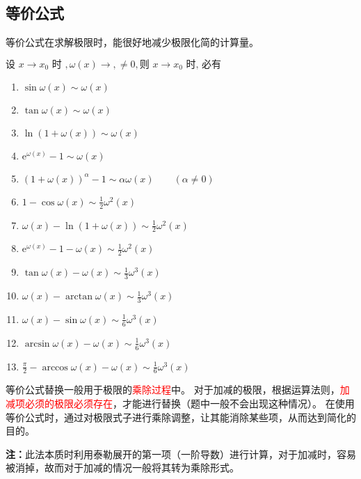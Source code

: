 \subsection{等价公式}
等价公式在求解极限时，能很好地减少极限化简的计算量。
\begin{theorem}
    \label{th:等价公式}
    $\text{设~}x\to x_0\text{ 时~},\omega(x)\to,\neq 0, \text{则~}x\to x_0\text{ 时, 必有}$
    \begin{multicols}{2}
        \begin{enumerate}
            \item $\sin \omega(x) \sim \omega(x)$
            \item $\tan \omega(x) \sim \omega(x)$
            \item $\ln (1+\omega(x)) \sim \omega(x)$
            \item $\mathrm{e}^{\omega(x)}-1 \sim \omega(x)$
            \item $(1+\omega(x))^\alpha -1 \sim \alpha \omega(x) \qquad (\alpha \neq 0)$

            \item $1-\cos \omega(x) \sim \frac{1}{2}\omega^2(x)$
            \item $\omega(x)-\ln(1+\omega(x)) \sim \frac{1}{2}\omega^2(x)$
            \item $\mathrm{e}^{\omega(x)}-1-\omega(x) \sim \frac{1}{2}\omega^2(x)$

            \item $\tan \omega(x)-\omega(x) \sim \frac{1}{3}\omega^3(x)$
            \item $\omega(x)-\arctan \omega(x) \sim \frac{1}{3}\omega^3(x)$

            \item $\omega(x)-\sin \omega(x) \sim \frac{1}{6}\omega^3(x)$
            \item $\arcsin \omega(x) - \omega(x) \sim \frac{1}{6}\omega^3(x)$
            \item $\frac{\pi}{2} - \arccos \omega(x) - \omega(x) \sim \frac{1}{6}\omega^3(x)$

        \end{enumerate}
    \end{multicols}
\end{theorem}
\begin{situation}
    等价公式替换一般用于极限的\textcolor{red}{乘除过程}中。
    对于加减的极限，根据运算法则，\textcolor{red}{加减项必须的极限必须存在}，才能进行替换（题中一般不会出现这种情况）。
    在使用等价公式时，通过对极限式子进行乘除调整，让其能消除某些项，从而达到简化的目的。


    \textbf{注：}此法本质时利用泰勒展开的第一项（一阶导数）进行计算，对于加减时，容易被消掉，故而对于加减的情况一般将其转为乘除形式。
\end{situation}

